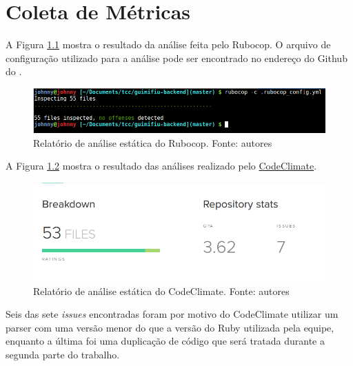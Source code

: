 \chapter{Coleta de Métricas}
\label{chap:metricas}

A Figura \ref{img:rubocop} mostra o resultado da análise feita pelo Rubocop. O arquivo de configuração utilizado para a análise pode ser encontrado no endereço do Github do  .

\begin{figure}[H]
    \centering
    \includegraphics[scale=0.5]{figuras/rubocop.png}
    \caption[Relatório de análise estática do Rubocop]{Relatório de análise estática do Rubocop. Fonte: autores}
    \label{img:rubocop}
\end{figure}

A Figura \ref{img:codeclimate} mostra o resultado das análises realizado pelo \href{https://codeclimate.com/github/Guimifiu/guimifiu-backend/}{CodeClimate}. 

\begin{figure}[H]
    \centering
    \includegraphics[scale=0.5]{figuras/codeclimate.png}
    \caption[Relatório de análise estática do CodeClimate]{Relatório de análise estática do CodeClimate. Fonte: autores}
    \label{img:codeclimate}
\end{figure}

Seis das sete \textit{issues} encontradas foram por motivo do CodeClimate utilizar um parser com uma versão menor do que a versão do Ruby utilizada pela equipe, enquanto a última foi uma duplicação de código que será tratada durante a segunda parte do trabalho.
